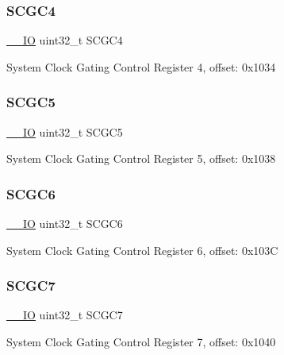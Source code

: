 \subsubsection{\texorpdfstring{SCGC4}{SCGC4}}
{\footnotesize\ttfamily \mbox{\hyperlink{core__cm0plus_8h_aec43007d9998a0a0e01faede4133d6be}{\+\_\+\+\_\+\+IO}} uint32\+\_\+t S\+C\+G\+C4}

System Clock Gating Control Register 4, offset\+: 0x1034 \mbox{\label{struct_s_i_m___type_a0c6b967745d0bb3e1bd280f7dd98db49}} 
\subsubsection{\texorpdfstring{SCGC5}{SCGC5}}
{\footnotesize\ttfamily \mbox{\hyperlink{core__cm0plus_8h_aec43007d9998a0a0e01faede4133d6be}{\+\_\+\+\_\+\+IO}} uint32\+\_\+t S\+C\+G\+C5}

System Clock Gating Control Register 5, offset\+: 0x1038 \mbox{\label{struct_s_i_m___type_a8075f4fb5887b43eba04eb636853be29}} 
\subsubsection{\texorpdfstring{SCGC6}{SCGC6}}
{\footnotesize\ttfamily \mbox{\hyperlink{core__cm0plus_8h_aec43007d9998a0a0e01faede4133d6be}{\+\_\+\+\_\+\+IO}} uint32\+\_\+t S\+C\+G\+C6}

System Clock Gating Control Register 6, offset\+: 0x103C \mbox{\label{struct_s_i_m___type_afa6e40b1dfd085e74bffc345bd359205}} 
\subsubsection{\texorpdfstring{SCGC7}{SCGC7}}
{\footnotesize\ttfamily \mbox{\hyperlink{core__cm0plus_8h_aec43007d9998a0a0e01faede4133d6be}{\+\_\+\+\_\+\+IO}} uint32\+\_\+t S\+C\+G\+C7}

System Clock Gating Control Register 7, offset\+: 0x1040 \mbox{\label{struct_s_i_m___type_a5baf01a3a36a117e2bebdd02d6d6876a}} 
